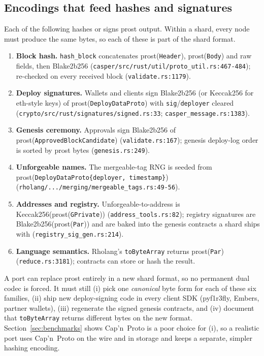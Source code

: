 \documentclass[10pt,a4paper]{article}
\newcommand{\f}[1]{\nolinkurl{#1}}
\newcommand{\capnp}{Cap'n~Proto}
\begin{document}
\subsection{Encodings that feed hashes and signatures}\label{sec:consensus}

Each of the following hashes or signs prost output. Within a shard, every node must produce the
same bytes, so each of these is part of the shard format.

\begin{enumerate}
  \item \textbf{Block hash.} \f{hash_block} concatenates prost(\f{Header}), prost(\f{Body}) and
        raw fields, then Blake2b256 (\f{casper/src/rust/util/proto_util.rs:467-484});
        re-checked on every received block (\f{validate.rs:1179}).
  \item \textbf{Deploy signatures.} Wallets and clients sign Blake2b256 (or Keccak256 for
        eth-style keys) of prost(\f{DeployDataProto}) with \f{sig}/\f{deployer} cleared
        (\f{crypto/src/rust/signatures/signed.rs:33}; \f{casper_message.rs:1383}).
  \item \textbf{Genesis ceremony.} Approvals sign Blake2b256 of prost(\f{ApprovedBlockCandidate})
        (\f{validate.rs:167}); genesis deploy-log order is sorted by prost bytes
        (\f{genesis.rs:249}).
  \item \textbf{Unforgeable names.} The mergeable-tag RNG is seeded from
        prost(\texttt{DeployDataProto\{deployer, timestamp\}})
        (\f{rholang/.../merging/mergeable_tags.rs:49-56}).
  \item \textbf{Addresses and registry.} Unforgeable-to-address is Keccak256(prost(\f{GPrivate}))
        (\f{address_tools.rs:82}); registry signatures are Blake2b256(prost(\f{Par}))
        and are baked into the genesis contracts a shard ships with (\f{registry_sig_gen.rs:214}).
  \item \textbf{Language semantics.} Rholang's \f{toByteArray} returns prost(\f{Par})
        (\f{reduce.rs:3181}); contracts can store or hash the result.
\end{enumerate}

\begin{finding}[title=Consequence]
A port can replace prost entirely in a new shard format, so no permanent dual codec is forced. It
must still (i) pick one \emph{canonical} byte form for each of these six families, (ii) ship new
deploy-signing code in every client SDK (pyf1r3fly, Embers, partner wallets), (iii) regenerate the
signed genesis contracts, and (iv) document that \f{toByteArray} returns different bytes on the new
format. Section~\ref{sec:benchmarks} shows \capnp{} is a poor choice for (i), so a realistic port uses
\capnp{} on the wire and in storage and keeps a separate, simpler hashing encoding.
\end{finding}
\end{document}
